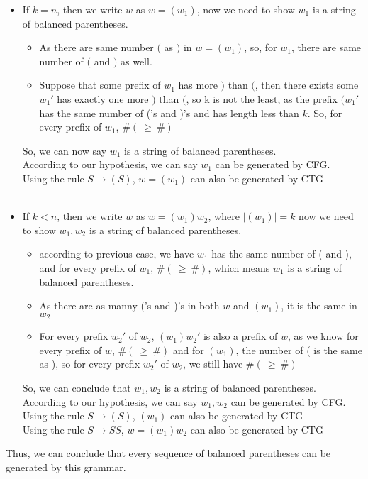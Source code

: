 \documentclass [9 pt]{article}
\theoremstyle{definition}
\begin{document}
\begin{itemize}
	\item If $k = n$, then we write $w$ as $w = (w_1)$, now we need to show $w_1$ is a string of balanced parentheses.
	\begin{itemize}
		\item As there are same number $($ as $)$ in $w = (w_1)$, so, for $w_1$, there are same number of  $($ and $)$ as well.
		\item Suppose that some prefix of $w_1$ has more $)$ than $($, then there exists some $w_1'$ has exactly one more $)$ than $($, so k is not the least, as the prefix $(w_1'$ has the same number of ('s and )'s and has length less than $k$. So, for every prefix of $w_1$, $\#(\ \geq \ \#)$
	\end{itemize}
	So, we can now say $w_1$ is a string of balanced parentheses.\\
	According to our hypothesis, we can say $w_1$ can be generated by CFG.\\
	Using the rule $ S \to (S) $, $w = (w_1)$ can also be generated by CTG\\
	\\
	\item If $k < n$, then we write $w$ as $w = (w_1)w_2$, where $|(w_1)| = k$ now we need to show $w_1, w_2$ is a string of balanced parentheses.
	\begin{itemize}
		\item according to previous case, we have $w_1$ has the same number of ( and ), and for every prefix of $w_1$, $\#(\ \geq \ \#)$, which means $w_1$ is a string of balanced parentheses.
		\item As there are as manny ('s and )'s in both $w$ and $(w_1)$, it is the same in $w_2$
		\item For every prefix $w_2'$ of $w_2$,  $(w_1)w_2'$ is also a prefix of $w$, as we know for every prefix of $w$, $\#(\  \geq \ \#)$ and for $(w_1)$, the number of ( is the same as ), so for every prefix $w_2'$ of $w_2$, we still have $\#(\  \geq \ \#)$
	\end{itemize}
	So, we can conclude that $w_1, w_2$ is a string of balanced parentheses.
	According to our hypothesis, we can say $w_1, w_2$ can be generated by CFG.\\
	Using the rule $ S \to (S) $, $(w_1)$ can also be generated by CTG\\
	Using the rule $ S \to SS $, $w = (w_1)w_2 $ can also be generated by CTG\\

\end{itemize}
Thus, we can conclude that  every sequence of balanced parentheses can be generated by this grammar.\\
\end{document}
